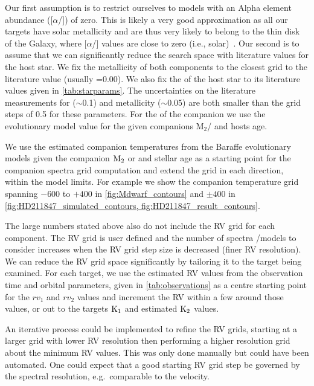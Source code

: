Our first assumption is to restrict ourselves to models with an Alpha element abundance ([\(\alpha\)/]) of zero.
This is likely a very good approximation as all our targets have solar metallicity and are thus very likely to belong to the thin disk of the Galaxy, where [\(\alpha\)/] values are close to zero (i.e., solar)~\citet[e.g.]{adibekyan_chemical_2012}.
Our second is to assume that we can significantly reduce the search space with literature values for the host star.
We fix the metallicity of both components to the closest grid to the literature value (usually \feh{}=0.00).
We also fix the \logg{} of the host star to its literature values given in \cref{tab:starparams}.
The uncertainties on the literature measurements for \logg{} (\(\sim\)0.1) and metallicity (\(\sim\)0.05) are both smaller than the grid steps of 0.5 for these parameters.
For the \logg{} of the companion we use the~\citet{baraffe_evolutionary_2003,baraffe_new_2015} evolutionary model value for the given companions \(\textrm{M}_2\)/\mtwosini{} and hosts age.

We use the estimated companion temperatures from the Baraffe evolutionary models given the companion \(\rm M_2\) or \mtwosini{} and stellar age as a starting point for the companion spectra grid computation and extend the grid in each direction, within the model limits.
For example we show the companion temperature grid spanning \(-600\) to \(+400\)\K{} in \cref{fig:Mdwarf_contours} and \(\pm400\)\K{} in \cref{fig:HD211847_simulated_contours, fig:HD211847_result_contours}.

The large numbers stated above also do not include the {RV} grid for each component.
The {RV} grid is user defined and the number of spectra /models to consider increases when the {RV} grid step size is decreased (finer {RV} resolution).
We can reduce the {RV} grid space significantly by tailoring it to the target being examined.
For each target, we use the estimated {RV} values from the observation time and orbital parameters, given in \cref{tab:observations} as a centre starting point for the \({rv}_1\) and \({rv}_2\) values and increment the {RV} within a few {\fwhm} around those values, or out to the targets \(\rm K_1\) and estimated \(\rm K_2\) values.

An iterative process could be implemented to refine the {RV} grids, starting at a larger grid with lower {RV} resolution then performing a higher resolution grid about the minimum \textchisquared{} {RV} values.
This was only done manually but could have been automated.
One could expect that a good starting {RV} grid step be governed by the spectral resolution, e.g.\ comparable to the {\fwhm} velocity.

